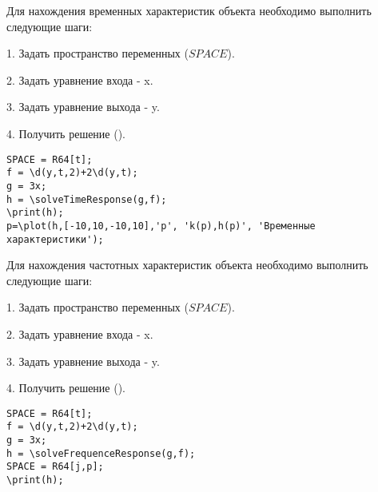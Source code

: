 Для нахождения временных характеристик объекта необходимо выполнить следующие шаги:

1. Задать пространство переменных ($SPACE$). 

2. Задать уравнение входа - x. 

3. Задать уравнение выхода - y. 

4. Получить решение ().

\begin{verbatim}
SPACE = R64[t]; 
f = \d(y,t,2)+2\d(y,t); 
g = 3x; 
h = \solveTimeResponse(g,f); 
\print(h);
p=\plot(h,[-10,10,-10,10],'p', 'k(p),h(p)', 'Временные характеристики');
\end{verbatim}


Для нахождения частотных характеристик объекта необходимо выполнить следующие шаги:

1. Задать пространство переменных ($SPACE$). 

2. Задать уравнение входа - x. 

3. Задать уравнение выхода - y. 

4. Получить решение ().

\begin{verbatim}
SPACE = R64[t]; 
f = \d(y,t,2)+2\d(y,t); 
g = 3x; 
h = \solveFrequenceResponse(g,f); 
SPACE = R64[j,p];
\print(h);
\end{verbatim}


